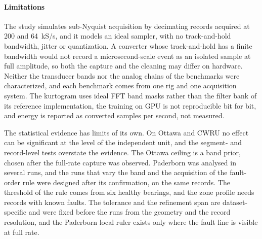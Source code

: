 \paragraph{Limitations}
The study simulates sub-Nyquist acquisition by decimating records acquired at 200 and 64~kS/s, and
it models an ideal sampler, with no track-and-hold bandwidth, jitter or quantization. A converter
whose track-and-hold has a finite bandwidth would not record a microsecond-scale event as an
isolated sample at full amplitude, so both the capture and the cleaning may differ on hardware.
Neither the transducer bands nor the analog chains of the benchmarks were characterized, and each
benchmark comes from one rig and one acquisition system. The kurtogram uses ideal FFT band masks
rather than the filter bank of its reference implementation, the training on GPU is not
reproducible bit for bit, and energy is reported as converted samples per second, not measured.

The statistical evidence has limits of its own. On Ottawa and CWRU no effect can be significant at
the level of the independent unit, and the segment- and record-level tests overstate the evidence.
The Ottawa ceiling is a band prior, chosen after the full-rate capture was observed. Paderborn was
analysed in several runs, and the runs that vary the band and the acquisition of the fault-order
rule were designed after its confirmation, on the same records. The threshold of the rule comes
from six healthy bearings, and the zone profile needs records with known faults. The tolerance and
the refinement span are dataset-specific and were fixed before the runs from the geometry and the
record resolution, and the Paderborn local ruler exists only where the fault line is visible at
full rate.

